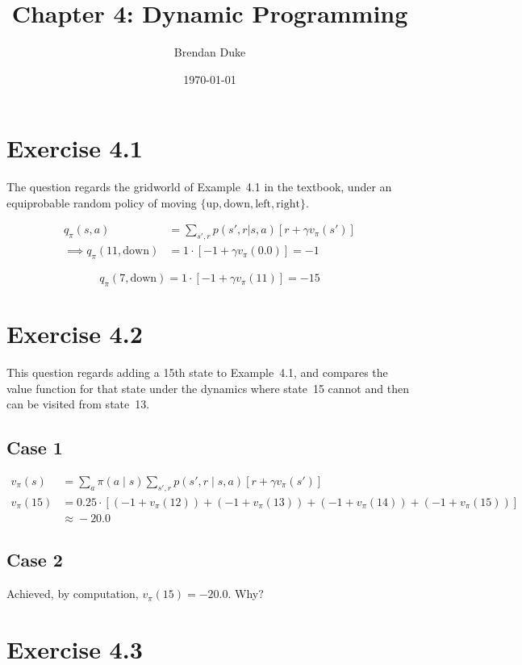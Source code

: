 \documentclass[a4paper, 12pt, titlepage]{article}
\date{\today}
\title{Chapter 4: Dynamic Programming}
\author{Brendan Duke}
\newcommand{\q}[2]{q_\pi(#1, #2)}
\renewcommand{\v}[1]{v_\pi(#1)}
\newcommand{\pol}[2]{\pi(#1 \mid{} #2)}
\begin{document}
\section{Exercise 4.1}

The question regards the gridworld of Example~4.1 in the textbook, under an
equiprobable random policy of moving
$\{\textrm{up}, \textrm{down}, \textrm{left}, \textrm{right}\}$.

\begin{align*}
        \q{s}{a} &= \sum_{s', r} p(s', r | s, a) [r + \gamma \v{s'}]  \\
        \implies \q{11}{\textrm{down}} &= 1 \cdot [-1 + \gamma \v{0.0}] = -1
\end{align*}

\begin{equation*}
        \q{7}{\textrm{down}} = 1 \cdot [-1 + \gamma \v{11}] = -15
\end{equation*}


\section{Exercise 4.2}

This question regards adding a 15th state to Example~4.1, and compares the
value function for that state under the dynamics where state~15 cannot and then
can be visited from state~13.


\subsection{Case 1}

\begin{align*}
        \v{s} &= \sum_a \pol{a}{s} \sum_{s', r} p(s', r \mid s, a) [r + \gamma \v{s'}] \\
        \v{15} &= 0.25 \cdot [(-1 + \v{12}) + (-1 + \v{13}) + (-1 + \v{14}) + (-1 + \v{15})] \\
        &\approx{} -20.0
\end{align*}


\subsection{Case 2}

Achieved, by computation, $\v{15} = -20.0$. Why?


\section{Exercise 4.3}
\end{document}
